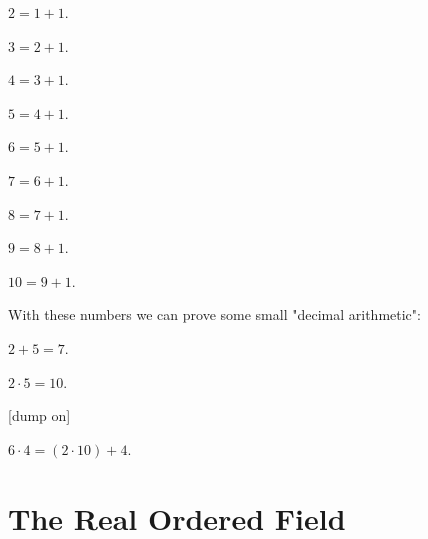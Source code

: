 \documentclass{article}
\begin{document}
\begin{forthel}

\begin{definition}
$2 = 1 + 1$.
\end{definition}

\begin{definition}
$3 = 2 + 1$.
\end{definition}

\begin{definition}
$4 = 3 + 1$.
\end{definition}

\begin{definition}
$5 = 4 + 1$.
\end{definition}

\begin{definition}
$6 = 5 + 1$.
\end{definition}

\begin{definition}
$7 = 6 + 1$.
\end{definition}

\begin{definition}
$8 = 7 + 1$.
\end{definition}

\begin{definition}
$9 = 8 + 1$.
\end{definition}

\begin{definition}
$10 = 9 + 1$.
\end{definition}
\end{forthel}
With these numbers we can prove some small "decimal arithmetic":
\begin{forthel}

\begin{lemma}
$2 + 5 = 7$.
\end{lemma}

\begin{lemma}
$2 \cdot 5 = 10$.
\end{lemma}

[dump on]

\begin{lemma}
$6 \cdot 4 = (2 \cdot 10) + 4$.
\end{lemma}


\end{forthel}

\section{The Real Ordered Field}
\end{document}
